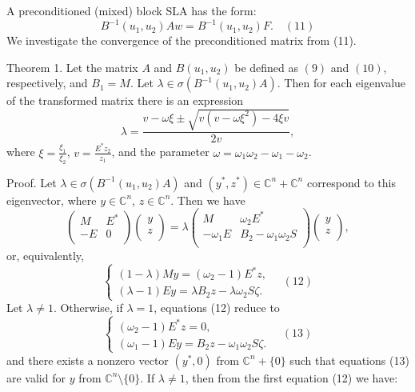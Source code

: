\documentclass{article}
\begin{document}
A preconditioned (mixed) block SLA has the form:
\[ B^{-1}(u_1, u_2)Aw = B^{-1}(u_1, u_2)F. \quad (11) \]
We investigate the convergence of the preconditioned matrix from (11).

Theorem 1. Let the matrix \(A\) and \(B(u_1, u_2) \) be defined as \((9)\) and \((10)\), respectively, and \(B_1 = M\). Let \(\lambda\in\sigma(B^{-1}(u_1, u_2)A) \). Then for each eigenvalue of the transformed matrix there is an expression
\[
\lambda = \frac{v - \omega \xi \pm \sqrt{v (v - \omega\xi^2) - 4\xi v}}{2v},
\]
where \( \xi =\frac{\xi_1}{\xi_2} \), \(v=\frac{E^*z_2}{z_1} \), and the parameter \( \omega= \omega_1\omega_2 - \omega_1 - \omega_2 \).

Proof. Let \(\lambda\in\sigma(B^{-1}(u_1, u_2)A)\) and \((y^*, z^*) \in \mathbb{C}^n+\mathbb{C}^n\) correspond to this eigenvector, where \(y\in\mathbb{C}^n\), \(z\in \mathbb{C}^n\). Then we have
\[
\begin{pmatrix}
M & E^* \\
-E & 0 \\
\end{pmatrix}
\begin{pmatrix}
y \\
z \\
\end{pmatrix}
= \lambda
\begin{pmatrix}
M & \omega_2E^* \\
-\omega_1E & B_2 - \omega_1\omega_2S \\
\end{pmatrix}
\begin{pmatrix}
y \\
z \\
\end{pmatrix},
\]
or, equivalently,
\[
\begin{cases}
(1 - \lambda)My = (\omega_2 - 1)E^*z, \\
(\lambda - 1)Ey = \lambda B_2z - \lambda\omega_2S\zeta.
\end{cases}
\quad (12)
\]
Let \(\lambda\neq 1\). Otherwise, if \(\lambda = 1\), equations (12) reduce to
\[
\begin{cases}
(\omega_2 - 1)E^*z = 0, \\
(\omega_1 - 1)Ey = B_2z - \omega_1\omega_2S\zeta.
\end{cases}
\quad(13)
\]
and there exists a nonzero vector \( (y^*, 0)\) from \(\mathbb{C}^n+\{0\}\) such that equations (13) are valid for \(y\) from \(\mathbb{C}^n \setminus \{0\}\). If \(\lambda\neq 1 \), then from the first equation (12) we have:
\end{document}
